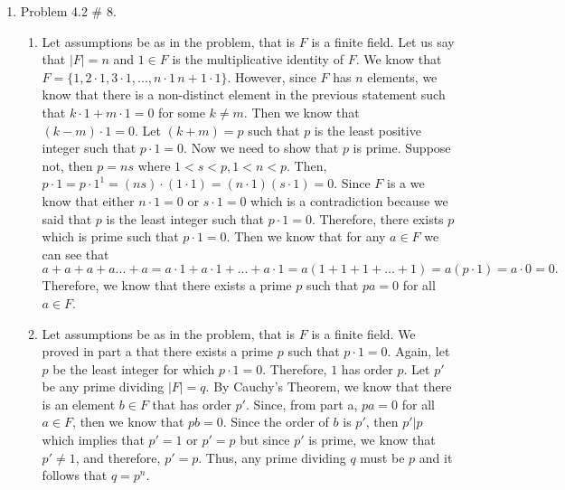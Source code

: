 \documentclass[11pt]{article}
\begin{document}
\begin{enumerate}
\pagebreak

\item Problem 4.2 \# 8.

\begin{enumerate}
    \item 
    
    Let assumptions be as in the problem, that is $F$ is a finite field. Let us say that $|F|=n$ and $1\in F$ is the multiplicative identity of $F$. We know that $F=\{1, 2\cdot 1, 3\cdot 1, ..., n\cdot 1\, n+1\cdot 1\}$. However, since $F$ has $n$ elements, we know that there is a non-distinct element in the previous statement such that $k\cdot 1+m\cdot 1=0$ for some $k\neq m$. Then we know that $(k-m)\cdot 1 = 0.$ Let $(k+m)=p$ such that $p$ is the least positive integer such that $p\cdot 1=0$. Now we need to show that $p$ is prime. Suppose not, then $p=ns$ where $1<s<p, 1<n<p$. Then, $p\cdot 1 = p\cdot 1^1 = (ns)\cdot(1\cdot 1) = (n\cdot 1)(s\cdot 1)=0$. Since $F$ is a we know that either $n\cdot 1 = 0$ or $s\cdot 1=0$ which is a contradiction because we said that $p$ is the least integer such that $p\cdot 1=0.$ Therefore, there exists $p$ which is prime such that $p\cdot 1 = 0$. Then we know that for any $a\in F$ we can see that $a+a+a+a...+a=a\cdot 1+a\cdot 1+...+a\cdot1=a(1+1+1+...+1)=a(p\cdot1)=a\cdot0=0.$ Therefore, we know that there exists a prime $p$ such that $pa=0$ for all $a\in F$.
    
    \item
    
    Let assumptions be as in the problem, that is $F$ is a finite field. We proved in part a that there exists a prime $p$ such that $p\cdot 1 = 0.$ Again, let $p$ be the least integer for which $p\cdot 1=0$. Therefore, $1$ has order $p$. Let $p'$ be any prime dividing $|F|=q.$ By Cauchy's Theorem, we know that there is an element $b\in F$ that has order $p'$. Since, from part a, $pa=0$ for all $a\in F$, then we know that $pb=0$. Since the order of $b$ is $p'$, then $p'|p$ which implies that $p'=1$ or $p'=p$ but since $p'$ is prime, we know that $p'\neq 1$, and therefore, $p'=p$. Thus, any prime dividing $q$ must be $p$ and it follows that $q=p^n.$
    
\end{enumerate}

\end{enumerate}
\end{document}
